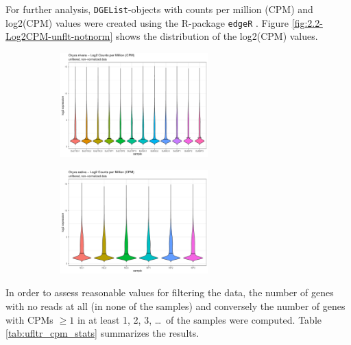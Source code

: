 For further analysis, \verb|DGEList|-objects with counts per million (CPM) and log2(CPM) values were created using the R-package \verb|edgeR| \autocite{R-edgeR, edgeR2010}. Figure \ref{fig:2.2-Log2CPM-unflt-notnorm} shows the distribution of the log2(CPM) values.

\begin{figure}[htbp]
    \caption{Log2(CPM) distribution of the unfiltered, non-normalized data}
    \label{fig:2.2-Log2CPM-unflt-notnorm}
    \begin{subfigure}[t]{0.64\linewidth}
        \label{fig:2.2-Log2CPM-unflt-notnorm-Oryza_nivara}
        \includegraphics[width=\textwidth, height=4cm]{../../results/plots-and-tables/2.2-Log2CPM-unflt-notnorm-Oryza_nivara}
    \end{subfigure}
    \begin{subfigure}[t]{0.32\linewidth}
        \label{fig:2.2-Log2CPM-unflt-notnorm-Oryza_sativa}
        \includegraphics[width=\textwidth, height=4cm]{../../results/plots-and-tables/2.2-Log2CPM-unflt-notnorm-Oryza_sativa}
    \end{subfigure}
\end{figure}

In order to assess reasonable values for filtering the data, the number of genes with no reads at all (in none of the samples) and conversely the number of genes with CPMs \(\ge 1\) in at least 1, 2, 3, \dots\ of the samples were computed. Table \ref{tab:ufltr_cpm_stats} summarizes the results.

